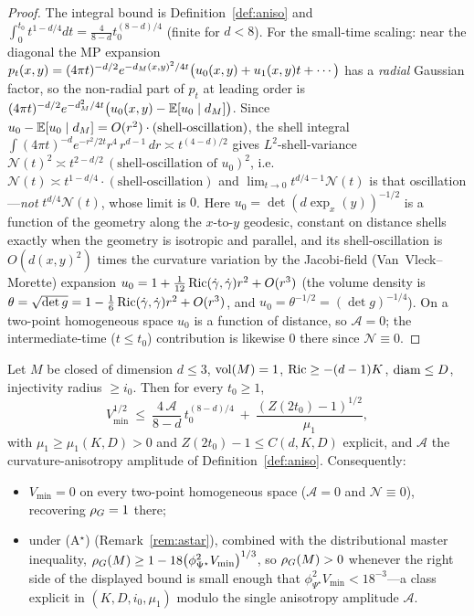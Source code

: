 \begin{proof}
The integral bound is Definition~\ref{def:aniso} and $\int_0^{t_0}t^{1-d/4}dt=\frac{4}{8-d}
t_0^{(8-d)/4}$ (finite for $d<8$). For the small-time scaling: near the diagonal the MP
expansion $p_t(x,y)=(4\pi t)^{-d/2}e^{-d_M(x,y)^2/4t}\bigl(u_0(x,y)+u_1(x,y)t+\cdots\bigr)$ has
a \emph{radial} Gaussian factor, so the non-radial part of $p_t$ at leading order is
$(4\pi t)^{-d/2}e^{-d_M^2/4t}\bigl(u_0(x,y)-\mathbb E[u_0\mid d_M]\bigr)$. Since $u_0-\mathbb E[u_0\mid d_M]
=O(r^2)\cdot(\text{shell-oscillation})$, the shell integral
$\int(4\pi t)^{-d}e^{-r^2/2t}r^4\,r^{d-1}\,dr\asymp t^{(4-d)/2}$ gives $L^2$-shell-variance
$\mathcal N(t)^2\asymp t^{2-d/2}\,(\text{shell-oscillation of }u_0)^2$, i.e.\
$\mathcal N(t)\asymp t^{1-d/4}\cdot(\text{shell-oscillation})$ and
$\lim_{t\to0}t^{d/4-1}\mathcal N(t)$ is that oscillation---\emph{not} $t^{d/4}\mathcal N(t)$,
whose limit is $0$. Here $u_0=\det(d\exp_x(y))^{-1/2}$ is
a function of the geometry along the $x$-to-$y$ geodesic, constant on distance shells exactly
when the geometry is isotropic and parallel, and its shell-oscillation is $O(d(x,y)^2)$ times
the curvature variation by the Jacobi-field (Van~Vleck--Morette) expansion
$u_0=1+\tfrac1{12}\operatorname{Ric}(\dot\gamma,\dot\gamma)r^2+O(r^3)$ (the volume density is
$\theta=\sqrt{\det g}=1-\tfrac16\operatorname{Ric}(\dot\gamma,\dot\gamma)r^2+O(r^3)$, and
$u_0=\theta^{-1/2}=(\det g)^{-1/4}$).
On a two-point homogeneous space $u_0$ is a function of distance, so $\mathcal A=0$; the
intermediate-time ($t\le t_0$) contribution is likewise $0$ there since $\mathcal N\equiv0$.
\end{proof}

\begin{theorem}\label{thm:main}
Let $M$ be closed of dimension $d\le3$, $\operatorname{vol}(M)=1$, $\operatorname{Ric}\ge-(d-1)K$, $\operatorname{diam}\le D$,
injectivity radius $\ge i_0$. Then for every $t_0\ge1$,
\[
V_{\min}^{1/2}\ \le\ \frac{4\,\mathcal A}{8-d}\,t_0^{(8-d)/4}\ +\ \frac{(Z(2t_0)-1)^{1/2}}{\mu_1},
\]
with $\mu_1\ge\mu_1(K,D)>0$ and $Z(2t_0)-1\le C(d,K,D)$ explicit, and $\mathcal A$ the
curvature-anisotropy amplitude of Definition~\ref{def:aniso}. Consequently:
\begin{itemize}
\item[(i)] $V_{\min}=0$ on every two-point homogeneous space ($\mathcal A=0$ and
$\mathcal N\equiv0$), recovering $\rho_G=1$ there;
\item[(ii)] under \textup{(A$^\star$)} (Remark~\ref{rem:astar}), combined with the
distributional master inequality, $\rho_G(M)\ge1-18\bigl(\phi_{\Psi^\star}^2V_{\min}\bigr)^{1/3}$,
so $\rho_G(M)>0$ whenever the right side of the displayed bound is small enough that
$\phi_{\Psi^\star}^2V_{\min}<18^{-3}$---a class explicit in $(K,D,i_0,\mu_1)$ modulo the single
anisotropy amplitude $\mathcal A$.
\end{itemize}
\end{theorem}

